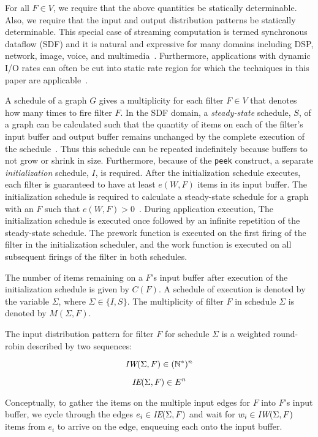 For all $F \in V$, we require that the above quantities be statically
determinable.  Also, we require that the input and output distribution
patterns be statically determinable.  This special case of streaming
computation is termed synchronous dataflow (SDF) and it is natural and
expressive for many domains including DSP, network, image, voice, and
multimedia~\cite{leeSDF}.  Furthermore, applications with dynamic
I/O rates can often be cut into static rate region for which the
techniques in this paper are applicable~\cite{chen:graphics-hardware:2005}.

A schedule of a graph $G$ gives a multiplicity for each filter $F \in
V$ that denotes how many times to fire filter $F$. In the SDF domain,
a {\it steady-state} schedule, $S$, of a graph can be calculated such
that the quantity of items on each of the filter's input buffer and
output buffer remains unchanged by the complete execution of the
schedule~\cite{lee87}.  Thus this schedule can be repeated
indefinitely because buffers to not grow or shrink in size.
Furthermore, because of the {\tt peek} construct, a separate {\it
initialization} schedule, $I$, is required. After the initialization
schedule executes, each filter is guaranteed to have at least $e(W,
F)$ items in its input buffer. The initialization schedule is required
to calculate a steady-state schedule for a graph with an $F$ such that
$e(W, F) > 0$~\cite{karczmarek:lctes:2003}.  During application
execution, The initialization schedule is executed once followed by an
infinite repetition of the steady-state schedule.  The prework
function is executed on the first firing of the filter in the
initialization scheduler, and the work function is executed on all
subsequent firings of the filter in both schedules.

The number of items remaining on a $F$'s input buffer after execution
of the initialization schedule is given by $C(F)$. A schedule of
execution is denoted by the variable $\Sigma$, where $\Sigma \in
\{I, S\}$.  The multiplicity of filter $F$ in schedule $\Sigma$ is
denoted by $M(\Sigma, F)$.

The input distribution pattern for filter $F$ for schedule $\Sigma$ is
a weighted round-robin described by two sequences:

\[ \mbox{\it IW}(\Sigma, F) \in (\mathbb{N}^{*})^n \]

\[ \mbox{\it IE}(\Sigma, F) \in E^n \]
 
Conceptually, to gather the items on the multiple input edges for $F$
into $F$'s input buffer, we cycle through the edges $e_i \in
\mbox{\it IE}(\Sigma, F)$ and wait for $w_i \in \mbox{\it IW}(\Sigma, F)$ items
from $e_i$ to arrive on the edge, enqueuing each onto the input buffer.

